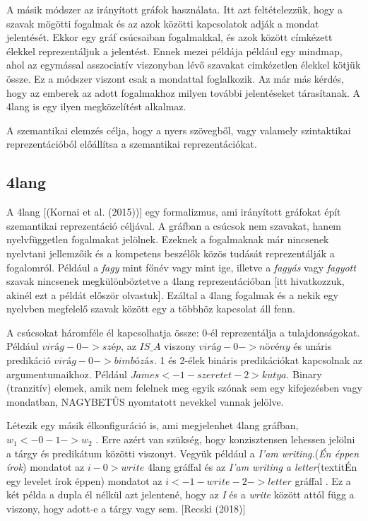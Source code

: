 A másik módszer az irányított gráfok használata.
Itt azt feltételezzük, hogy a szavak mögötti fogalmak és az azok közötti kapcsolatok adják a mondat jelentését.
Ekkor egy gráf csúcsaiban fogalmakkal, és azok között címkézett élekkel reprezentáljuk a jelentést.
Ennek mezei példája például egy mindmap, ahol az egymással asszociatív viszonyban lévő szavakat cimkézetlen élekkel kötjük össze.
Ez a módszer viszont csak a mondattal foglalkozik.
Az már más kérdés, hogy az emberek az adott fogalmakhoz milyen további jelentéseket tárasítanak.
A 4lang is egy ilyen megközelítést alkalmaz.

A szemantikai elemzés célja, hogy a nyers szövegből, vagy valamely szintaktikai reprezentációból előállítsa a szemantikai reprezentációkat.



\subsection{4lang}
A 4lang  [(Kornai et al. (2015))] egy formalizmus, ami irányított gráfokat épít szemantikai reprezentáció céljával. A gráfban a csúcsok nem szavakat, hanem nyelvfüggetlen fogalmakat jelölnek. Ezeknek a fogalmaknak már nincsenek nyelvtani jellemzőik és a kompetens beszélők közös tudását reprezentálják a fogalomról. Például a \textit{fagy} mint főnév vagy mint ige, illetve a \textit{fagyás} vagy \textit{fagyott} szavak nincsenek megkülönböztetve a 4lang reprezentációban [itt hivatkozzuk, akinél ezt a példát először olvastuk]. Ezáltal a 4lang fogalmak és a nekik egy nyelvben megfelelő szavak között egy a többhöz kapcsolat áll fenn.

A csúcsokat háromféle él kapcsolhatja össze:
0-él reprezentálja a tulajdonságokat. Például \textit{$virág -0-> szép$}, az \textit{$IS\_A$} viszony \textit{$virág -0->  növény$} és unáris predikáció \textit{$virág -0-> bimbózás$}.
1 és 2-élek bináris predikációkat kapcsolnak az argumentumaikhoz. Például \textit{$James <-1- szeretet -2> kutya$}.
Binary (tranzitív) elemek, amik nem felelnek meg egyik szónak sem egy kifejezésben vagy mondatban, NAGYBETŰS nyomtatott nevekkel vannak jelölve.

Létezik egy másik élkonfiguráció is, ami megjelenhet 4lang gráfban, \textit{$w_1 <-0-1-> w_2$} . Erre azért van szükség, hogy konzisztensen lehessen jelölni a tárgy és predikátum közötti viszonyt. Vegyük például a \textit{I’am writing.}(\textit{Én éppen írok})  mondatot az \textit{$i -0> write$} 4lang gráffal és az \textit{I’am writing a letter}(textit{Én egy levelet írok éppen}) mondatot az \textit{$i <-1- write -2-> letter$} gráffal . Ez a két példa a dupla él nélkül azt jelentené, hogy  az \textit{I} és a \textit{write} között attól függ a viszony, hogy adott-e a tárgy vagy sem. [Recski (2018)]

